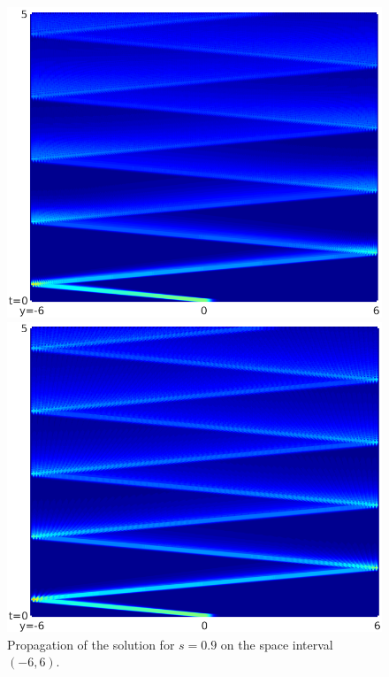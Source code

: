 \documentclass[10pt]{article}
\begin{document}
\begin{figure}[!h]
	\centering 
	\begin{minipage}{0.3\textwidth}
		\includegraphics[scale=0.37]{./figures/plot_frac_schrodinger1_09_6}
	\end{minipage}
	\hspace{0.5cm}	
	\begin{minipage}{0.3\textwidth}
		\includegraphics[scale=0.37]{./figures/plot_frac_schrodinger2_09_6}
	\end{minipage}	
	\caption{Propagation of the solution for $s=0.9$ on the space interval $(-6,6)$.}\label{plot_03}
\end{figure} 


\end{document}
